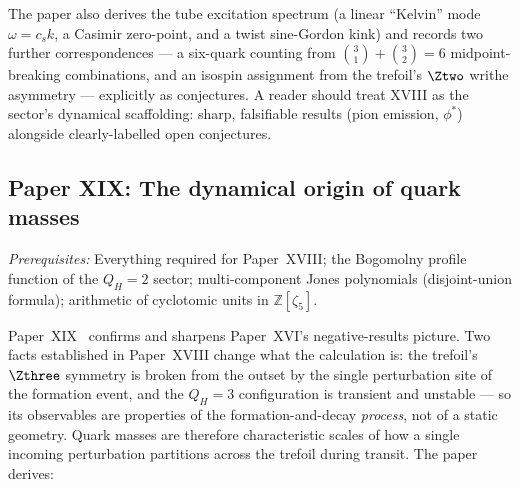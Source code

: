 \documentclass[11pt,a4paper]{article}
\newcommand{\ZZ}{\mathbb{Z}}
\begin{document}
The paper also derives the tube excitation spectrum (a linear ``Kelvin'' mode
$\omega=c_s k$, a Casimir zero-point, and a twist sine-Gordon kink) and records
two further correspondences --- a six-quark counting from
$\binom31+\binom32=6$ midpoint-breaking combinations, and an isospin assignment
from the trefoil's $\Ztwo$ writhe asymmetry --- explicitly as conjectures.
A reader should treat XVIII as the sector's dynamical scaffolding: sharp,
falsifiable results (pion emission, $\phi^*$) alongside clearly-labelled open
conjectures.

\subsection{Paper XIX: The dynamical origin of quark masses}

\textit{Prerequisites:} Everything required for Paper~XVIII; the Bogomolny
profile function of the $Q_H=2$ sector; multi-component Jones polynomials
(disjoint-union formula); arithmetic of cyclotomic units in $\ZZ[\zeta_5]$.

Paper~XIX~\cite{Paper19} confirms and sharpens Paper~XVI's negative-results
picture. Two facts established in Paper~XVIII change what the calculation is:
the trefoil's $\Zthree$ symmetry is broken from the outset by the single
perturbation site of the formation event, and the $Q_H=3$ configuration is
transient and unstable --- so its observables are properties of the
formation-and-decay \emph{process}, not of a static geometry. Quark masses are
therefore characteristic scales of how a single incoming perturbation partitions
across the trefoil during transit. The paper derives:
\end{document}

